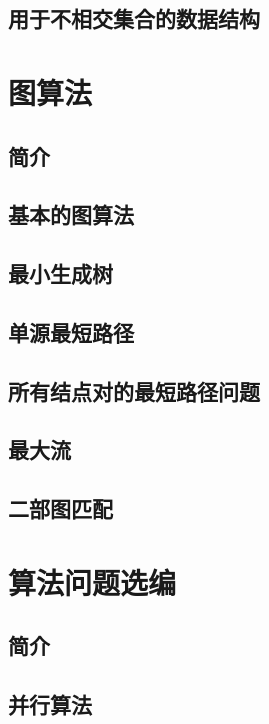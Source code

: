\documentclass[lang=cn,newtx,10pt,scheme=chinese]{elegantbook}
\begin{document}
\chapter{用于不相交集合的数据结构}\label{chapter-19}

\part{图算法}

\chapter*{简介}

\chapter{基本的图算法}\label{chapter-20}

\chapter{最小生成树}\label{chapter-21}

\chapter{单源最短路径}\label{chapter-22}

\chapter{所有结点对的最短路径问题}\label{chapter-23}

\chapter{最大流}\label{chapter-24}

\chapter{二部图匹配}\label{chapter-25}

\part{算法问题选编}

\chapter*{简介}

\chapter{并行算法}\label{chapter-26}
\end{document}

